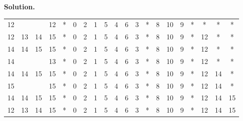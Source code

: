 \documentclass[12pt, a4paper]{article}
\newenvironment{sol}[1][Solution]
{\par\medskip\noindent \textbf{#1.} }
{\medskip}
\begin{document}
\begin{sol}
\begin{center}
\begin{tabular}{cccc|cccccccccccccccc}
				{\color{green}12} & {} & {} & 12 &
				* & {\color{gray}0} & {\color{gray}2} & {\color{gray}1} & {\color{gray}5} & {\color{gray}4} & {\color{gray}6} & {\color{gray}3} & * & {\color{gray}8} & {\color{gray}10} & {\color{gray}9} & * & * & * & * \\
				
				{\color{black}12} & {\color{red}13} & {14} & 15 &
				* & {\color{gray}0} & {\color{gray}2} & {\color{gray}1} & {\color{gray}5} & {\color{gray}4} & {\color{gray}6} & {\color{gray}3} & * & {\color{gray}8} & {\color{gray}10} & {\color{gray}9} & * & {\color{green}12} & * & * \\
				
				{\color{black}14} & {14} & {15} & 15 &
				* & {\color{gray}0} & {\color{gray}2} & {\color{gray}1} & {\color{gray}5} & {\color{gray}4} & {\color{gray}6} & {\color{gray}3} & * & {\color{gray}8} & {\color{gray}10} & {\color{gray}9} & * & {\color{gray}12} & * & * \\
				
				{\color{green}14} & {} & {} & 13 &
				* & {\color{gray}0} & {\color{gray}2} & {\color{gray}1} & {\color{gray}5} & {\color{gray}4} & {\color{gray}6} & {\color{gray}3} & * & {\color{gray}8} & {\color{gray}10} & {\color{gray}9} & * & {\color{gray}12} & * & * \\
				
				{\color{black}14} & {\color{red}14} & {15} & 15 &
				* & {\color{gray}0} & {\color{gray}2} & {\color{gray}1} & {\color{gray}5} & {\color{gray}4} & {\color{gray}6} & {\color{gray}3} & * & {\color{gray}8} & {\color{gray}10} & {\color{gray}9} & * & {\color{gray}12} & {\color{green}14} & * \\
				
				{\color{green}15} & {} & {} & 15 &
				* & {\color{gray}0} & {\color{gray}2} & {\color{gray}1} & {\color{gray}5} & {\color{gray}4} & {\color{gray}6} & {\color{gray}3} & * & {\color{gray}8} & {\color{gray}10} & {\color{gray}9} & * & {\color{gray}12} & {\color{gray}14} & * \\
				
				{\color{black}14} & {\color{green}14} & {\color{red}15} & 15 &
				* & {\color{gray}0} & {\color{gray}2} & {\color{gray}1} & {\color{gray}5} & {\color{gray}4} & {\color{gray}6} & {\color{gray}3} & * & {\color{gray}8} & {\color{gray}10} & {\color{gray}9} & * & {\color{gray}12} & {\color{gray}14} & {\color{green}15} \\
				
				{12} & {\color{green}13} & {\color{red}14} & 15 &
				* & {\color{gray}0} & {\color{gray}2} & {\color{gray}1} & {\color{gray}5} & {\color{gray}4} & {\color{gray}6} & {\color{gray}3} & * & {\color{gray}8} & {\color{gray}10} & {\color{gray}9} & * & {\color{gray}12} & {\color{green}14} & {\color{gray}15} \\
				

\end{tabular}
\end{center}
\end{sol}
\end{document}
